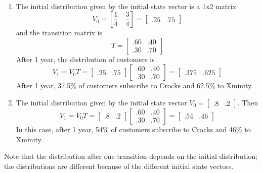 \begin{solution} ~

    \begin{enumerate}
        \item The initial distribution given by the initial state vector is a 1x2 matrix
              \[ V_0 = \left[\frac{1}{4} \quad \frac{3}{4}\right] = \begin{bmatrix} .25 & .75 \end{bmatrix} \]
              and the transition matrix is
              \[ T = \begin{bmatrix} .60 & .40 \\ .30 & .70 \end{bmatrix} \]
              After 1 year, the distribution of customers is
              \[ V_1 = V_0T = \begin{bmatrix} .25 & .75 \end{bmatrix} \begin{bmatrix} .60 & .40 \\ .30 & .70 \end{bmatrix} = \begin{bmatrix} .375 & .625 \end{bmatrix} \]
              After 1 year, 37.5\% of customers subscribe to Crocks and 62.5\% to Xminity.
        \item The initial distribution given by the initial state vector \( V_0 = \begin{bmatrix} .8 & .2 \end{bmatrix} \). Then
              \[ V_1 = V_0T = \begin{bmatrix} .8 & .2 \end{bmatrix} \begin{bmatrix} .60 & .40 \\ .30 & .70 \end{bmatrix} = \begin{bmatrix} .54 & .46 \end{bmatrix} \]
              In this case, after 1 year, 54\% of customers subscribe to Crocks and 46\% to Xminity.

    \end{enumerate}
    Note that the distribution after one transition depends on the initial distribution; the distributions are different because of the different initial state vectors.
\end{solution}

